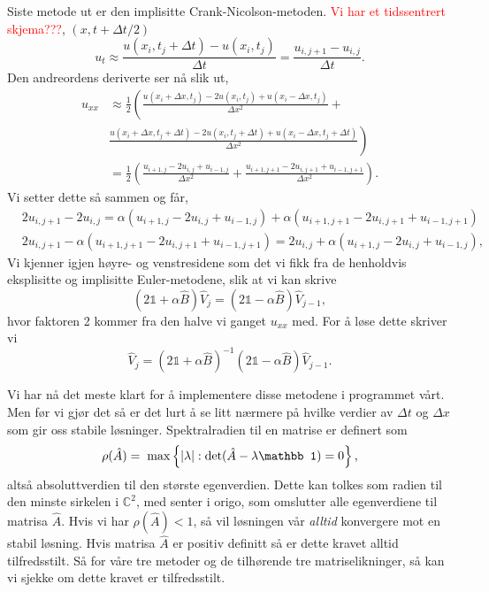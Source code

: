 \documentclass[norsk, 10pt]{article}
\def\para#1{\left( #1 \right)}
\newcommand{\red}[1]{\textcolor{red}{#1}}
\begin{document}
Siste metode ut er den implisitte Crank-Nicolson-metoden. \red{Vi har et tidssentrert skjema???}, $(x,t+\Delta t/2)$
 \[
u_t\approx \frac{u(x_i,t_j+\Delta t)-u(x_i,t_j)}{\Delta t} = \frac{u_{i,j+1}-u_{i,j}}{\Delta t}.
\]
Den andreordens deriverte ser nå slik ut,
\begin{align*}
u_{xx}&\approx \frac{1}{2}\left(\frac{u(x_i+\Delta x,t_j)-2u(x_i,t_j)+u(x_i-\Delta x,t_j)}{\Delta x^2}+\right.\\
&\left. \frac{u(x_i+\Delta x,t_j+\Delta t)-2u(x_i,t_j+\Delta t)+u(x_i-\Delta x,t_j+\Delta t)}{\Delta x^2} \right) \\
& = \frac{1}{2}\left(\frac{u_{i+1,j}-2u_{i,j}+u_{i-1,j}}{\Delta x^2}+\frac{u_{i+1,j+1}-2u_{i,j+1}+u_{i-1,j+1}}{\Delta x^2} \right).
\end{align*}
Vi setter dette så sammen og får,
\begin{align}
& 2u_{i,j+1}-2u_{i,j} = \alpha\para{u_{i+1,j}-2u_{i,j}+u_{i-1,j}}+\alpha\para{u_{i+1,j+1}-2u_{i,j+1}+u_{i-1,j+1}} \nonumber\\
& 2u_{i,j+1} - \alpha\para{u_{i+1,j+1}-2u_{i,j+1}+u_{i-1,j+1}} = 2u_{i,j} + \alpha\para{u_{i+1,j}-2u_{i,j}+u_{i-1,j}}, \label{eq:CNmetode}
\end{align}
Vi kjenner igjen høyre- og venstresidene som det vi fikk fra de henholdvis eksplisitte og implisitte Euler-metodene, slik at vi kan skrive
$$ (2\mathbb 1 + \alpha \hat B)\hat V_j = (2\mathbb 1 - \alpha \hat B)\hat V_{j-1},$$
hvor faktoren 2 kommer fra den halve vi ganget $u_{xx}$ med. For å løse dette skriver vi
$$ \hat V_j = (2\mathbb 1 + \alpha \hat B)^{-1}(2\mathbb 1 - \alpha \hat B)\hat V_{j-1}. $$

Vi har nå det meste klart for å implementere disse metodene i programmet vårt. Men før vi gjør det så er det lurt å se litt nærmere på hvilke verdier av  $\Delta t$ og $\Delta x$ som gir oss stabile løsninger. Spektralradien til en matrise er definert som
$$ \rho(\hat{A}) = \hspace{0.1cm}\mathrm{max}\left\{|\lambda|:\mathrm{det}(\hat A-\lambda\mathbb 1)=0\right\}, $$
altså absoluttverdien til den største egenverdien. Dette kan tolkes som radien til den minste sirkelen i $\mathbb C^2$, med senter i origo, som omslutter alle egenverdiene til matrisa $\hat A$. Hvis vi har $\rho(\hat{A}) < 1$, så vil løsningen vår \emph{alltid} konvergere mot en stabil løsning. Hvis matrisa $\hat A $ er positiv definitt så er dette kravet alltid tilfredsstilt. Så for våre tre metoder og de tilhørende tre matriselikninger, så kan vi sjekke om dette kravet er tilfredsstilt.
\end{document}
